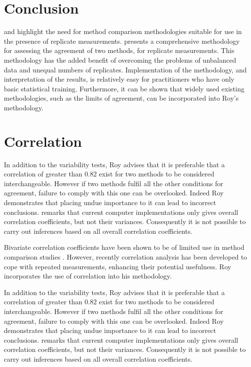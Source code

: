 \documentclass[12pt, a4paper]{report}
\theoremstyle{plain}
\theoremstyle{definition}
\theoremstyle{remark}
\begin{document}
	\section{Conclusion}
	\citet{BXC2008} and \citet{roy} highlight the need for method comparison methodologies suitable for use in the presence of replicate measurements. \citet{roy} presents a comprehensive methodology for assessing the agreement of two methods, for replicate measurements. This methodology has the added benefit of overcoming the problems of unbalanced data and unequal numbers of replicates. Implementation of the methodology, and interpretation of the results, is relatively easy for practitioners who have only basic statistical training. Furthermore, it can be shown that widely used existing methodologies, such as the limits of agreement, can be incorporated into Roy's methodology.
	

	
	
	
	

	\section{Correlation}
	In addition to the variability tests, Roy advises that it is preferable that a correlation of greater than $0.82$ exist for two methods to be considered interchangeable. However if two methods fulfil all the other conditions for agreement, failure to comply with this one can be overlooked. Indeed Roy demonstrates that placing undue importance to it can lead to incorrect conclusions. \citet{ARoy2009} remarks that current computer implementations only gives overall correlation coefficients, but not their variances. Consequently it is not possible to carry out inferences based on all overall correlation coefficients.
	

	
	Bivariate correlation coefficients have been shown to be of
	limited use in method comparison studies \citep{BA86}. However,
	recently correlation analysis has been developed to cope with
	repeated measurements, enhancing their potential usefulness. Roy
	incorporates the use of correlation into his methodology.
	
	In addition to the variability tests, Roy advises that it is preferable that a correlation of greater than $0.82$ exist for two methods to be considered interchangeable. However if two methods fulfil all the other conditions for agreement, failure to comply with this one can be overlooked. Indeed Roy demonstrates that placing undue importance to it can lead to incorrect conclusions. \citet{ARoy2009} remarks that current computer implementations only gives overall correlation coefficients, but not their variances. Consequently it is not possible to carry out inferences based on all overall correlation coefficients.
	
\end{document}
